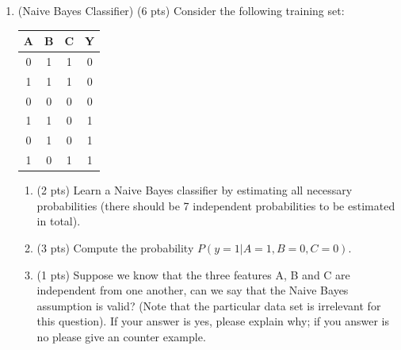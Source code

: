 \documentclass{article}
\begin{document}
\begin{enumerate}
\begin{itemize}
\end{itemize}
\item (Naive Bayes Classifier) (6 pts) Consider the following training set:
\begin{center}
\begin{tabular}{|c|c|c|c|}\hline
A&B&C&Y\\ \hline
0&1&1&0 \\ \hline
1&1&1&0 \\ \hline
0&0&0&0 \\ \hline
1&1&0&1 \\ \hline
0&1&0&1 \\ \hline
1&0&1&1 \\ \hline
\end{tabular}
\end{center}
\begin{enumerate}
\item (2 pts) Learn a Naive Bayes classifier by estimating
all necessary probabilities (there should be 7 independent probabilities to be 
estimated in total).

\item (3 pts) Compute the probability $P(y=1|A=1, B=0, C=0)$.
\item (1 pts) Suppose we know that the three features A, B and C are independent 
from one another, can we say that the Naive Bayes assumption is valid? (Note 
that the particular data set is irrelevant for this question). If your answer 
is yes, please explain why; if you answer is no please give an counter example.

\end{enumerate}
\end{enumerate}
\end{document}
